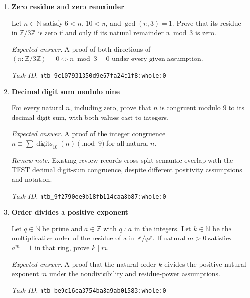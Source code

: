 \documentclass[11pt]{article}
\newcommand{\pth}[1]{\nolinkurl{#1}}
\begin{document}
\begin{enumerate}[label={DEV \arabic*.},leftmargin=4.5em,itemsep=1em]
Let $a,m,n,k,q,r\in\mathbb N$ satisfy $m>1$, $\gcd(a,m)=1$, and $k=\operatorname{ord}_{m}(a)$. Assume $a^n=1$ in $\mathbb Z/m\mathbb Z$, $n=qk+r$, and $r<k$. Prove $r=0$.

\emph{Expected answer.} A proof that the specified remainder $r$ is zero under the order, residue-power, decomposition, and bound assumptions.

\emph{Task ID.} \pth{ntb_92a8e6497c8f664aa1696ccf:whole:0}

\item \textbf{Zero residue and zero remainder}\label{qn:dev:24}

Let $n\in\mathbb N$ satisfy $6<n$, $10<n$, and $\gcd(n,3)=1$. Prove that its residue in $\mathbb Z/3\mathbb Z$ is zero if and only if its natural remainder $n\bmod3$ is zero.

\emph{Expected answer.} A proof of both directions of $(n:\mathbb Z/3\mathbb Z)=0\Longleftrightarrow n\bmod3=0$ under every given assumption.

\emph{Task ID.} \pth{ntb_9c107931350d9e67fa24c1f8:whole:0}

\item \textbf{Decimal digit sum modulo nine}\label{qn:dev:25}

For every natural $n$, including zero, prove that $n$ is congruent modulo $9$ to its decimal digit sum, with both values cast to integers.

\emph{Expected answer.} A proof of the integer congruence $n\equiv\sum\operatorname{digits}_{10}(n)\pmod9$ for all natural $n$.

\emph{Review note.} Existing review records cross-split semantic overlap with the TEST decimal digit-sum congruence, despite different positivity assumptions and notation.

\emph{Task ID.} \pth{ntb_9f2790ee0b18fb114caa8b87:whole:0}

\item \textbf{Order divides a positive exponent}\label{qn:dev:26}

Let $q\in\mathbb N$ be prime and $a\in\mathbb Z$ with $q\nmid a$ in the integers. Let $k\in\mathbb N$ be the multiplicative order of the residue of $a$ in $\mathbb Z/q\mathbb Z$. If natural $m>0$ satisfies $a^m=1$ in that ring, prove $k\mid m$.

\emph{Expected answer.} A proof that the natural order $k$ divides the positive natural exponent $m$ under the nondivisibility and residue-power assumptions.

\emph{Task ID.} \pth{ntb_be9c16ca3754ba8a9ab01583:whole:0}


\end{enumerate}
\end{document}
